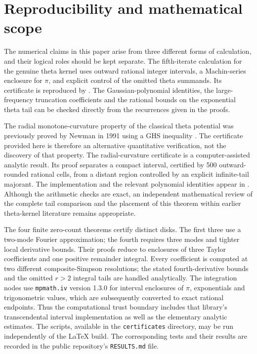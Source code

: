 \section{Reproducibility and mathematical scope}
\label{sec:verification-release}
The numerical claims in this paper arise from three
different forms of calculation, and their logical roles
should be kept separate. The fifth-iterate calculation
for the genuine theta kernel uses outward rational
integer intervals, a Machin-series enclosure for
$\pi$, and explicit control of the omitted theta
summands. Its certificate is reproduced by
.
The Gaussian-polynomial identities, the
large-frequency truncation coefficients and
the rational bounds on the exponential theta
tail can be checked directly from the
recurrences given in the proofs.

The radial monotone-curvature property of the classical
theta potential was previously proved by Newman in 1991
using a GHS inequality \cite{NewmanGHS}. The certificate
provided here is therefore an alternative quantitative
verification, not the discovery of that property.
The radial-curvature certificate is a
computer-assisted analytic result.
Its proof separates a compact interval,
certified by 500 outward-rounded rational
cells, from a distant region controlled
by an explicit infinite-tail majorant.
The implementation and the relevant
polynomial identities appear in
.
Although the arithmetic checks are exact,
an independent mathematical review of
the complete tail comparison and the
placement of this theorem within earlier
theta-kernel literature remains appropriate.

The four finite zero-count theorems certify
distinct disks. The first three use a two-mode
Fourier approximation; the fourth requires
three modes and tighter local derivative bounds.
Their proofs reduce to enclosures of
three Taylor coefficients and one
positive remainder integral. Every
coefficient is computed at two
different composite-Simpson resolutions;
the stated fourth-derivative bounds
and the omitted $r>2$ integral tails
are handled analytically.
The integration nodes use
\texttt{mpmath.iv} version 1.3.0 for
interval enclosures of $\pi$,
exponentials and trigonometric values,
which are subsequently converted to
exact rational endpoints.
Thus the computational trust boundary
includes that library's transcendental
interval implementation as well as
the elementary analytic estimates.
The scripts, available in the
\texttt{certificates} directory,
may be run independently of the
LaTeX build. The corresponding tests
and their results are recorded
in the public repository's
\texttt{RESULTS.md} file.

